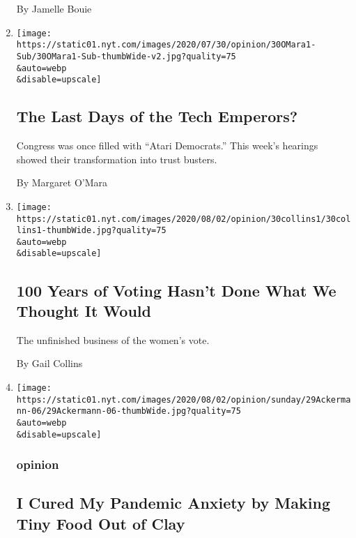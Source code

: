 \begin{enumerate}
  By Jamelle Bouie
\item
  \href{/2020/07/30/opinion/sunday/tech-congress-hearings-facebook.html}{}

  \texttt{[image: https://static01.nyt.com/images/2020/07/30/opinion/30OMara1-Sub/30OMara1-Sub-thumbWide-v2.jpg?quality=75\\\&auto=webp\\\&disable=upscale]}

  \hypertarget{the-last-days-of-the-tech-emperors}{%
  \subsection{The Last Days of the Tech
  Emperors?}\label{the-last-days-of-the-tech-emperors}}

  Congress was once filled with ``Atari Democrats.'' This week's
  hearings showed their transformation into trust busters.

  By Margaret O'Mara
\item
  \href{/2020/07/30/opinion/sunday/19th-amendment-women-suffrage.html}{}

  \texttt{[image: https://static01.nyt.com/images/2020/08/02/opinion/30collins1/30collins1-thumbWide.jpg?quality=75\\\&auto=webp\\\&disable=upscale]}

  \hypertarget{100-years-of-voting-hasnt-done-what-we-thought-it-would}{%
  \subsection{100 Years of Voting Hasn't Done What We Thought It
  Would}\label{100-years-of-voting-hasnt-done-what-we-thought-it-would}}

  The unfinished business of the women's vote.

  By Gail Collins
\item
  \href{/2020/07/29/opinion/sunday/food-covid-quarantine-clay.html}{}

  \texttt{[image: https://static01.nyt.com/images/2020/08/02/opinion/sunday/29Ackermann-06/29Ackermann-06-thumbWide.jpg?quality=75\\\&auto=webp\\\&disable=upscale]}

  \hypertarget{opinion-1}{%
  \subsubsection{opinion}\label{opinion-1}}

  \hypertarget{i-cured-my-pandemic-anxiety-by-making-tiny-food-out-of-clay}{%
  \subsection{I Cured My Pandemic Anxiety by Making Tiny Food Out of
  Clay}\label{i-cured-my-pandemic-anxiety-by-making-tiny-food-out-of-clay}}


\end{enumerate}
